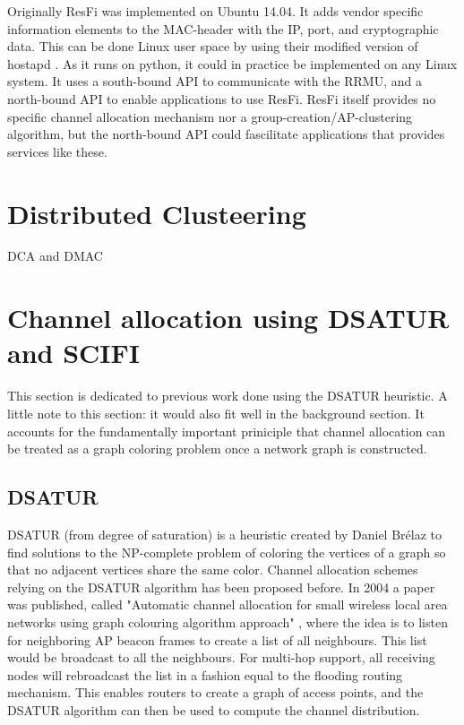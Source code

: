 Originally ResFi was implemented on Ubuntu 14.04. It adds vendor specific information elements to the MAC-header with the IP, port, and cryptographic data. This can be done Linux user space by using their modified version of hostapd \cite{resfigit}.
As it runs on python, it could in practice be implemented on any Linux system. It uses a south-bound API to communicate with the RRMU, and a north-bound API to enable applications to use ResFi. ResFi itself provides no specific channel allocation mechanism nor a group-creation/AP-clustering algorithm, but the north-bound API could fascilitate applications that provides services like these.

\section{Distributed Clusteering}
DCA and DMAC

\section{Channel allocation using DSATUR and SCIFI} 
This section is dedicated to previous work done using the DSATUR heuristic. A little note to this section: it would also fit well in the background section. It accounts for the fundamentally important priniciple that
channel allocation can be treated as a graph coloring problem once a network graph is constructed.  

\subsection{DSATUR}
DSATUR (from degree of saturation) is a heuristic created by Daniel Brélaz \cite{Brelaz} to find solutions to the NP-complete problem of coloring the vertices of a graph so that no adjacent vertices share the same color. 
Channel allocation schemes relying on the DSATUR algorithm has been proposed before. In 2004 a paper was published, called
"Automatic channel allocation for small wireless local area networks using graph colouring algorithm approach" \cite{mahonen}, where the idea is to listen for neighboring AP beacon frames to create a list of all neighbours.
This list would be broadcast to all the neighbours. For multi-hop support, all receiving nodes will rebroadcast the list in a fashion equal to the flooding routing mechanism. This enables routers to create a graph of access points, and the DSATUR algorithm can then be used to compute the channel distribution. 

